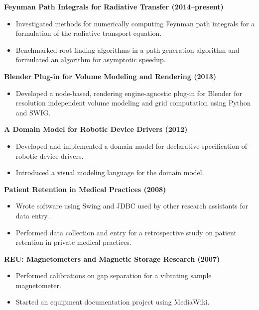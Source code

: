 \textbf{Feynman Path Integrals for Radiative Transfer (2014--present)}

\begin{itemize}
  \item Investigated methods for numerically computing Feynman path integrals
        for a formulation of the radiative transport equation.
  \item Benchmarked root-finding algorithms in a path generation algorithm and
        formulated an algorithm for asymptotic speedup.
\end{itemize}

\textbf{Blender Plug-in for Volume Modeling and Rendering (2013)}

\begin{itemize}
  \item Developed a node-based, rendering engine-agnostic plug-in for Blender
        for resolution independent volume modeling and grid computation using
        Python and SWIG.
\end{itemize}

\textbf{A Domain Model for Robotic Device Drivers (2012)}

\begin{itemize}
  \item Developed and implemented a domain model for declarative specification
        of robotic device drivers.
  \item Introduced a visual modeling language for the domain model.
\end{itemize}

\textbf{Patient Retention in Medical Practices (2008)}

\begin{itemize}
  \item Wrote software using Swing and JDBC used by other research assistants
        for data entry.
  \item Performed data collection and entry for a retrospective study on
        patient retention in private medical practices.
\end{itemize}

\textbf{REU: Magnetometers and Magnetic Storage Research (2007)}

\begin{itemize}
  \item Performed calibrations on gap separation for a vibrating sample
        magnetometer.
  \item Started an equipment documentation project using MediaWiki.
\end{itemize}
